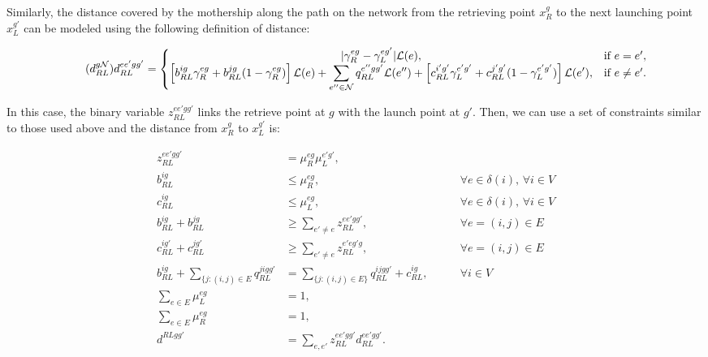 \medskip

Similarly, the distance covered by the mothership along the path on the network from the retrieving point $x_R^g$ to the next launching point $x_L^{g'}$ can be modeled using the following definition of distance:

\begin{equation}\tag{$d^{g\mathcal N}_{RL}$}\label{eq:dRLg}
d_{RL}^{ee'gg'} = \left\{\begin{matrix}
|\gamma_{R}^{eg} - \gamma_{L}^{eg'}|\mathcal L(e), & \text{if } e = e',\\ 
\left[b_{RL}^{ig}\gamma_{R}^{eg} + b_{RL}^{jg}(1 - \gamma_{R}^{eg})\right]\mathcal L(e) + \displaystyle \sum_{e''\in \mathcal N}q_{RL}^{e''gg'}\mathcal L(e'') + \left[c_{RL}^{i'g'}\gamma_{L}^{e'g'} + c_{RL}^{j'g'}(1 - \gamma_{L}^{e'g'})\right]\mathcal L(e'), & \text{if } e \neq e'.
\end{matrix}\right.
\end{equation}

In this case, the binary variable $z_{RL}^{ee'gg'}$ links the retrieve point at $g$ with the launch point at $g'$. Then, we can use a set of constraints similar to those used above and the distance from $x_R^g$ to $x_L^{g'}$ is:

\begin{align}
    z_{RL}^{ee'gg'} & = \mu_{R}^{eg}\mu_L^{e'g'},\label{prodRLggN}\\
    b_{RL}^{ig} & \leq \mu_{R}^{eg}, \label{bRt1}&\qquad \forall e\in\delta(i),\,\forall i\in V \\
    c_{RL}^{ig} & \leq \mu_{L}^{eg}, \label{cRt1}&\qquad \forall e\in\delta(i),\,\forall i\in V\\
    b_{RL}^{ig} + b_{RL}^{jg} & \geq \sum_{e'\neq e} z_{RL}^{ee'gg'}, &\qquad \forall e=(i, j)\in E\label{bRt2}\\
    c_{RL}^{ig'} + c_{RL}^{jg'} & \geq \sum_{e'\neq e} z_{RL}^{e'eg'g}, &\qquad \forall e=(i, j)\in E\label{cRt2}\\
    b_{RL}^{ig} + \sum_{\{j:(i, j)\in E} q_{RL}^{jigg'} & = \sum_{\{j:(i, j)\in E\}} q_{RL}^{ijgg'} +  c_{RL}^{ig}, \label{flow}&\qquad \forall i \in V\\
    \sum_{e\in E} \mu_{L}^{eg} & = 1,  \label{muLe} \\
    \sum_{e\in E} \mu_{R}^{eg} & = 1, \label{muRe}\\
    d^{RLgg'} & = \sum_{e, e'} z_{RL}^{ee'gg'} d_{RL}^{ee'gg'}. \label{dRLt}
\end{align}

